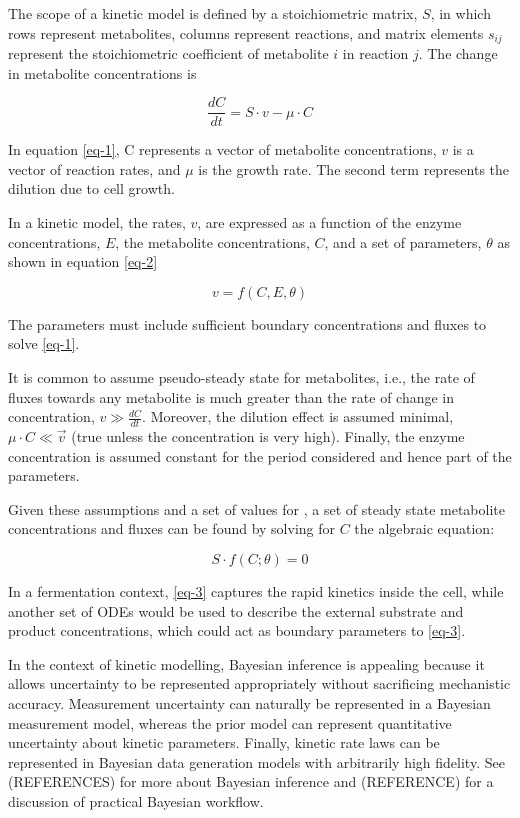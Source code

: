 \documentclass[
  letterpaper,
  DIV=11,
  numbers=noendperiod]{scrartcl}
\begin{document}
The scope of a kinetic model is defined by a stoichiometric matrix,
\(S\), in which rows represent metabolites, columns represent reactions,
and matrix elements \(s_{ij}\) represent the stoichiometric coefficient
of metabolite \(i\) in reaction \(j\). The change in metabolite
concentrations is

\begin{equation}\label{eq-1}
\frac{dC}{dt} = S\cdot v - \mu\cdot C 
\end{equation}

In equation \eqref{eq-1}, C represents a vector of metabolite
concentrations, \(v\) is a vector of reaction rates, and \(\mu\) is the
growth rate. The second term represents the dilution due to cell growth.

In a kinetic model, the rates, \(v\), are expressed as a function of the
enzyme concentrations, \(E\), the metabolite concentrations, \(C\), and
a set of parameters, \(\theta\) as shown in equation \eqref{eq-2}

\begin{equation}\label{eq-2}
v = f(C, E, \theta)
\end{equation}

The parameters must include sufficient boundary concentrations and
fluxes to solve \eqref{eq-1}.

It is common to assume pseudo-steady state for metabolites, i.e., the
rate of fluxes towards any metabolite is much greater than the rate of
change in concentration, \(𝑣 \gg \frac{𝑑𝐶}{𝑑𝑡}\). Moreover, the dilution
effect is assumed minimal, \(\mu\cdot C \ll \vec{v}\) (true unless the
concentration is very high). Finally, the enzyme concentration is
assumed constant for the period considered and hence part of the
parameters.

Given these assumptions and a set of values for \theta, a set of steady
state metabolite concentrations and fluxes can be found by solving for
\(C\) the algebraic equation:

\begin{equation}\label{eq-3}
S\cdot f(C;\theta) = 0
\end{equation}

In a fermentation context, \eqref{eq-3} captures the rapid kinetics
inside the cell, while another set of ODEs would be used to describe the
external substrate and product concentrations, which could act as
boundary parameters to \eqref{eq-3}.

In the context of kinetic modelling, Bayesian inference is appealing
because it allows uncertainty to be represented appropriately without
sacrificing mechanistic accuracy. Measurement uncertainty can naturally
be represented in a Bayesian measurement model, whereas the prior model
can represent quantitative uncertainty about kinetic parameters.
Finally, kinetic rate laws can be represented in Bayesian data
generation models with arbitrarily high fidelity. See (REFERENCES) for
more about Bayesian inference and (REFERENCE) for a discussion of
practical Bayesian workflow.
\end{document}
